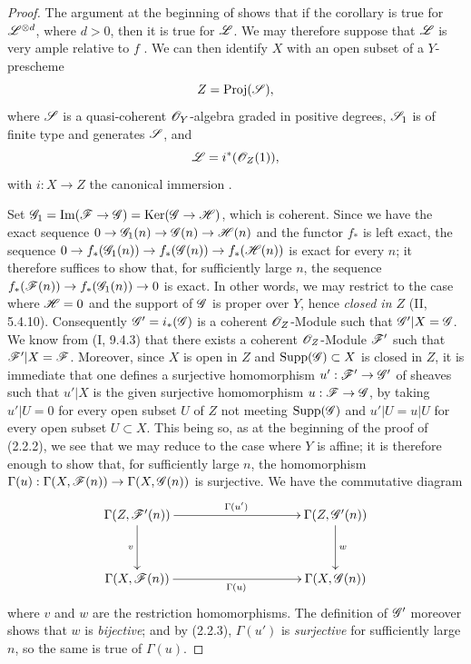 \begin{proof}
The argument at the beginning of  shows that if the corollary is true for $\mathscr{L}^{\otimes d}$, where $d>0$, then it is true for $\mathscr{L}$.
We may therefore suppose that $\mathscr{L}$ is very ample relative to $f$ .
We can then identify $X$ with an open subset of a $Y$-prescheme
\[
  Z=\operatorname{Proj}(\mathscr{S}),
\]
where $\mathscr{S}$ is a quasi-coherent $\mathscr{O}_Y$-algebra graded in positive degrees, $\mathscr{S}_1$ is of finite type and generates $\mathscr{S}$, and
\[
  \mathscr{L}=i^*(\mathscr{O}_Z(1)),
\]
with $i:X\to Z$ the canonical immersion .

Set
$\mathscr{G}_1=\operatorname{Im}(\mathscr{F}\to\mathscr{G})
=\operatorname{Ker}(\mathscr{G}\to\mathscr{H})$, which is coherent. Since we have the
exact sequence $0\to\mathscr{G}_1(n)\to\mathscr{G}(n)\to\mathscr{H}(n)$ and the functor
$f_*$ is left exact, the sequence
$0\to f_*(\mathscr{G}_1(n))\to f_*(\mathscr{G}(n))\to f_*(\mathscr{H}(n))$ is exact for every
$n$; it therefore suffices to show that, for sufficiently large $n$, the
sequence $f_*(\mathscr{F}(n))\to f_*(\mathscr{G}_1(n))\to0$ is exact. In other words, we
may restrict to the case where $\mathscr{H}=0$ and the support of $\mathscr{G}$ is
proper over $Y$, hence \emph{closed in $Z$} (II, 5.4.10). Consequently
$\mathscr{G}'=i_*(\mathscr{G})$ is a coherent $\mathscr{O}_Z$-Module such that
$\mathscr{G}'|X=\mathscr{G}$. We know from (I, 9.4.3) that there exists a coherent
$\mathscr{O}_Z$-Module $\mathscr{F}'$ such that $\mathscr{F}'|X=\mathscr{F}$. Moreover, since $X$
is open in $Z$ and $\operatorname{Supp}(\mathscr{G})\subset X$ is closed in $Z$, it
is immediate that one defines a surjective homomorphism
$u':\mathscr{F}'\to\mathscr{G}'$ of sheaves such that $u'|X$ is the given surjective
homomorphism $u:\mathscr{F}\to\mathscr{G}$, by taking $u'|U=0$ for every open subset $U$
of $Z$ not meeting $\operatorname{Supp}(\mathscr{G})$ and $u'|U=u|U$ for every open
subset $U\subset X$. This being so, as at the beginning of the proof of
(2.2.2), we see that we may reduce to the case where $Y$ is affine; it is
therefore enough to show that, for sufficiently large $n$, the homomorphism
$\Gamma(u):\Gamma(X,\mathscr{F}(n))\to\Gamma(X,\mathscr{G}(n))$ is surjective. We have
the commutative diagram
\[
\xymatrix@C=35mm@R=12mm{
\Gamma(Z,\sh{F}'(n)) \ar[r]^{\Gamma(u')} \ar[d]_v &
\Gamma(Z,\sh{G}'(n)) \ar[d]^w \\
\Gamma(X,\sh{F}(n)) \ar[r]_{\Gamma(u)} & \Gamma(X,\sh{G}(n))
}
\]
where $v$ and $w$ are the restriction homomorphisms. The definition of
$\mathscr{G}'$ moreover shows that $w$ is \emph{bijective}; and by (2.2.3),
$\Gamma(u')$ is \emph{surjective} for sufficiently large $n$, so the same is
true of $\Gamma(u)$.
\end{proof}

